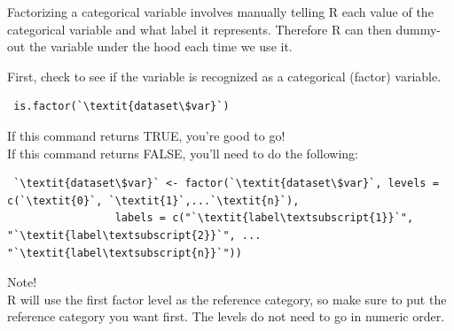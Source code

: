 \documentclass[12pt,letterpaper]{article}
\newcommand{\ind}{\phantom{AA}}
\begin{document}
\vspace{.5em}
Factorizing a categorical variable involves manually telling R each value of the categorical variable and what label it represents. Therefore R can then dummy-out the variable under the hood each time we use it.
\begin{tcolorbox}[title = Prepping Categorical Dependent Variables for Multiple Regression (Factorizing)]
\ind First, check to see if the variable is recognized as a categorical (factor) variable.
\begin{lstlisting}
 is.factor(`\textit{dataset\$var}`)
\end{lstlisting}
 If this command returns TRUE, you're good to go!\\
 If this command returns FALSE, you'll need to do the following:
\begin{lstlisting}
 `\textit{dataset\$var}` <- factor(`\textit{dataset\$var}`, levels = c(`\textit{0}`, `\textit{1}`,...`\textit{n}`),
                 labels = c("`\textit{label\textsubscript{1}}`", "`\textit{label\textsubscript{2}}`", ... "`\textit{label\textsubscript{n}}`"))
\end{lstlisting}
Note! \\
\ind R will use the first factor level as the reference category, so make sure to put the \\ \ind reference category you want first. The levels do not need to go in numeric order.
\end{tcolorbox}
\end{document}
